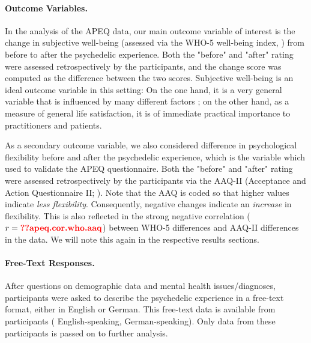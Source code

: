 \documentclass[man,floatsintext]{apa7}
\newcommand{\change}[1]{#1}
\begin{document}
\paragraph{Outcome Variables.} In the analysis of the APEQ data, our main outcome variable of interest is the  change in subjective well-being (assessed via the WHO-5 well-being index, \cite{topp2015}) from before to after the psychedelic experience. Both the "before" and "after" rating were assessed retrospectively by the participants, \change{and the change score was computed as the difference between the two scores}. Subjective well-being is an ideal outcome variable in this setting: On the one hand, it is a very general variable that is influenced by many different factors \change{\parencite{dolan2008we}}; on the other hand, as a measure of general life satisfaction, it is of immediate practical importance to practitioners and patients.

As a secondary outcome variable, we also considered difference in psychological flexibility before and after the psychedelic experience, which is the variable which \textcite{wolff2022acceptance} used to validate the APEQ questionnaire. Both the "before" and "after" rating were assessed retrospectively by the participants via the AAQ-II (Acceptance and Action Questionnaire II; \cite{bond2011preliminary,hoyer2013psychologische}). \change{Note that the AAQ is coded so that higher values indicate \emph{less flexibility}. Consequently, negative changes indicate an \emph{increase} in flexibility.  This is also reflected in the strong negative correlation ($r = \res{apeq.cor.who.aaq}$) between WHO-5 differences and AAQ-II differences in the data. We will note this again in the respective results sections.}

\paragraph{Free-Text Responses.} After questions on demographic data and mental health issues/diagnoses, participants were asked to describe the psychedelic experience in a free-text format, either in English or German. This free-text data is available from  participants ( English-speaking,  German-speaking). Only data from these  participants is passed on to further analysis.
\end{document}
